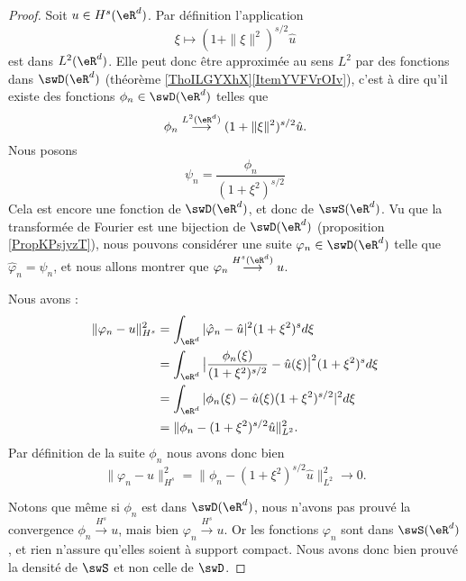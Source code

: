 \begin{proof}
    Soit $u\in H^s(\eR^d)$. Par définition l'application
    \begin{equation}
        \xi\mapsto (1+\| \xi \|^2)^{s/2}\hat u
    \end{equation}
    est dans \( L^2(\eR^d)\). Elle peut donc être approximée au sens \( L^2\) par des fonctions dans \( \swD(\eR^d)\) (théorème \ref{ThoILGYXhX}\ref{ItemYVFVrOIv}), c'est à dire qu'il existe des fonctions \( \phi_n\in\swD(\eR^d)\) telles que
    \begin{equation}
        \phi_n\stackrel{L^2(\eR^d)}{\longrightarrow}(1+\| \xi \|^2)^{s/2}\hat u.
    \end{equation}
    Nous posons
    \begin{equation}
        \psi_n=\frac{ \phi_n }{ (1+\xi^2)^{s/2} }
    \end{equation}
    Cela est encore une fonction de \( \swD(\eR^d)\), et donc de \( \swS(\eR^d)\). Vu que la transformée de Fourier est une bijection de \( \swD(\eR^d)\) (proposition \ref{PropKPsjyzT}), nous pouvons considérer une suite \( \varphi_n\in\swD(\eR^d)\) telle que \( \hat \varphi_n=\psi_n \), et nous allons montrer que \( \varphi_n\stackrel{H^s(\eR^d)}{\longrightarrow}u\).

    Nous avons :
    \begin{subequations}
        \begin{align}
            \| \varphi_n-u \|^2_{H^s}&=\int_{\eR^d}| \hat \varphi_n-\hat u |^2(1+\xi^2)^sd\xi\\
            &=\int_{\eR^d}\big| \frac{ \phi_n(\xi) }{ (1+\xi^2)^{s/2} }-\hat u(\xi) \big|^2(1+\xi^2)^sd\xi\\
            &=\int_{\eR^d}| \phi_n(\xi)-\hat u(\xi)(1+\xi^2)^{s/2} |^2d\xi\\
            &=\| \phi_n-(1+\xi^2)^{s/2}\hat u \|^2_{L^2}.
        \end{align}
    \end{subequations}
    Par définition de la suite \( \phi_n\) nous avons donc bien 
    \begin{equation}
            \| \varphi_n-u \|^2_{H^s} =\| \phi_n-(1+\xi^2)^{s/2}\hat u \|^2_{L^2}\to 0.
    \end{equation}

    Notons que même si \( \phi_n\) est dans \( \swD(\eR^d)\), nous n'avons pas prouvé la convergence \( \phi_n\stackrel{H^s}{\longrightarrow}u\), mais bien \( \varphi_n\stackrel{H^s}{\longrightarrow}u\). Or les fonctions \( \varphi_n\) sont dans \( \swS(\eR^d)\), et rien n'assure qu'elles soient à support compact. Nous avons donc bien prouvé la densité de \( \swS\) et non celle de \( \swD\).
\end{proof}

